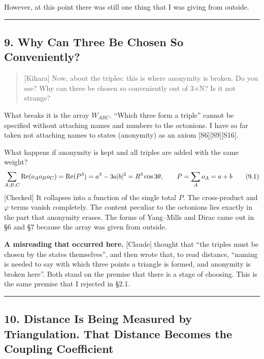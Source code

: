 \documentclass[
  a4paper,
]{article}
\begin{document}
However, at this point there was still one thing that I was giving from
outside.

\begin{center}\rule{0.5\linewidth}{0.5pt}\end{center}

\subsection{9. Why Can Three Be Chosen So
Conveniently?}\label{why-can-three-be-chosen-so-conveniently}

\begin{quote}
{[}Kihara{]} Now, about the triples: this is where anonymity is broken.
Do you see? Why can three be chosen so conveniently out of 3×N? Is it
not strange?
\end{quote}

What breaks it is the array \(W_{ABC}\). ``Which three form a triple''
cannot be specified without attaching names and numbers to the
octonions. I have so far taken not attaching names to states (anonymity)
as an axiom {[}S6{]}{[}S9{]}{[}S16{]}.

What happens if anonymity is kept and all triples are added with the
same weight? \[
\sum_{A,B,C}{\rm Re}(o_Ao_Bo_C) = {\rm Re}(P^3) = a^3 - 3a\lvert b\rvert^2 = R^3\cos3\theta,\qquad P = \sum_A o_A = a + b \tag{9.1}
\] {[}Checked{]} It collapses into a function of the single total \(P\).
The cross-product and \(\varphi\) terms vanish completely. The content
peculiar to the octonions lies exactly in the part that anonymity
erases. The forms of Yang--Mills and Dirac came out in §6 and §7 because
the array was given from outside.

\textbf{A misreading that occurred here.} {[}Claude{]} thought that
``the triples must be chosen by the states themselves'', and then wrote
that, to read distance, ``naming is needed to say with which three
points a triangle is formed, and anonymity is broken here''. Both stand
on the premise that there is a stage of choosing. This is the same
premise that I rejected in §2.1.

\begin{center}\rule{0.5\linewidth}{0.5pt}\end{center}

\subsection{10. Distance Is Being Measured by Triangulation. That
Distance Becomes the Coupling
Coefficient}\label{distance-is-being-measured-by-triangulation.-that-distance-becomes-the-coupling-coefficient}
\end{document}

